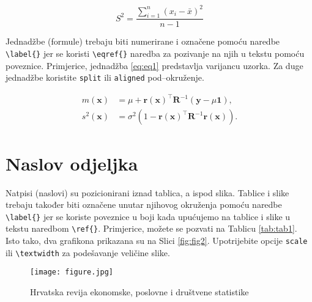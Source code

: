 \documentclass{crebsshr}
\begin{document}
	\begin{equation} \label{eq:eq1}
	S^2=\dfrac{\displaystyle\sum_{i=1}^{n}(x_i-\bar{x})^2}{n-1}
	\end{equation}

{\color{red} Jednadžbe (formule) trebaju biti numerirane i označene pomoću naredbe \verb=\label{}= jer se koristi \verb=\eqref{}= naredba za pozivanje na njih u tekstu pomoću poveznice.} Primjerice, {\color{blue} jednadžba} \eqref{eq:eq1} predstavlja varijancu uzorka. Za duge jednadžbe koristite \verb=split= ili \verb=aligned= pod--okruženje.

	\begin{equation} \label{eq:eq2}
	\begin{aligned}
	m(\textbf{x})&=\mu + \textbf{r}(\textbf{x})^\top \textbf{R}^{-1}(\textbf{y} - \mu \textbf{1}), \\
	s^2(\textbf{x})&=\sigma^2 \left(1 - \textbf{r}(\textbf{x})^\top \textbf{R}^{-1}\textbf{r}(\textbf{x}) \right).
	\end{aligned}
	\end{equation}



	\section{Naslov odjeljka}
{\color{red}Natpisi (naslovi) su pozicionirani iznad tablica, a ispod slika.} Tablice i slike trebaju također biti označene unutar njihovog okruženja pomoću naredbe \verb=\label{}= jer se koriste poveznice u boji kada upućujemo na tablice i slike u tekstu naredbom \verb=\ref{}=. Primjerice, možete se pozvati na {\color{blue} Tablicu} \ref{tab:tab1}. Isto tako, dva grafikona prikazana su na {\color{blue} Slici} \ref{fig:fig2}. Upotrijebite opcije \verb=scale= ili \verb=\textwidth= za podešavanje veličine slike.


		\begin{figure}[H]
		\centering
			\texttt{[image: figure.jpg]}
			\caption{Hrvatska revija ekonomske, poslovne i društvene statistike}
			\label{fig:fig1}
		\end{figure}
\end{document}
